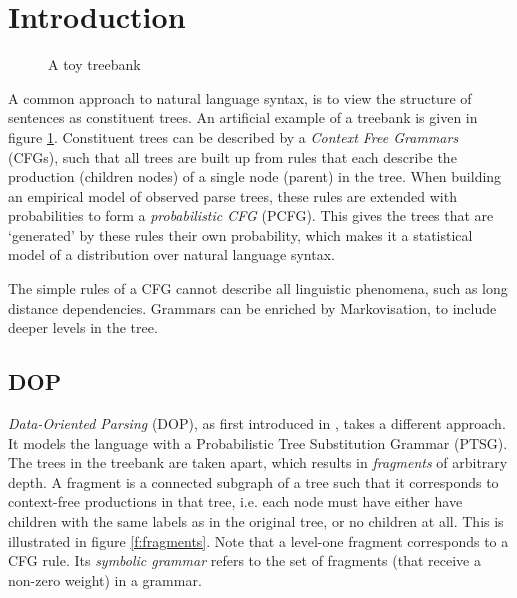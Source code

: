 
\section{Introduction}




\begin{figure}[h!]
\center 
\caption{A toy treebank} \label{f:treebank}
\end{figure}

A common approach to natural language syntax, is to view the structure of sentences as constituent trees. An artificial example of a treebank is given in figure \ref{f:treebank}. Constituent trees can be described by a \emph{Context Free Grammars} (CFGs),  such that all trees are built up from  rules that each describe the production (children nodes) of a single node (parent) in the tree. When building an empirical model of observed parse trees, these rules are extended with probabilities to form a \emph{probabilistic CFG} (PCFG). This gives the trees that are `generated' by these rules their own probability, which makes it a statistical model of a distribution over natural language syntax.

The simple rules of a CFG cannot describe all linguistic phenomena, such as long distance dependencies. Grammars can be enriched by Markovisation, to include deeper levels in the tree. 


\subsection{DOP}
\emph{Data-Oriented Parsing} (DOP), as first introduced in \cite{scha1990}, takes a different approach. It models the language with a Probabilistic Tree Substitution Grammar (PTSG). 
The trees in the treebank are taken apart, which results in \emph{fragments} of arbitrary depth. 
A fragment is a connected subgraph of a tree such that it corresponds to context-free productions in that tree, i.e. each node must have either have children with the same labels as in the original tree, or no children at all. This is illustrated in figure \ref{f:fragments}. Note that a level-one fragment corresponds to a CFG rule. Its \emph{symbolic grammar} refers to the set of fragments (that receive a non-zero weight) in a grammar. 



